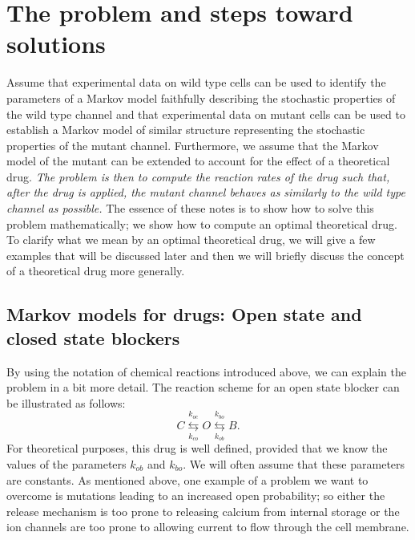 


\section{The problem and steps toward solutions}

Assume that experimental data on wild type cells can be used to identify the parameters of a Markov model faithfully describing the stochastic properties of the wild type channel and that experimental data on mutant cells can be used to establish a Markov model of similar structure representing the stochastic properties of the mutant channel. Furthermore, we assume that the Markov model of the mutant can be extended to account for the effect of a theoretical drug. {\it The problem is then to compute the reaction rates of the drug such that, after the drug is applied, the mutant channel behaves as similarly to the wild type channel as possible. } The essence of these notes is to show how to solve this problem mathematically; we show how to compute an optimal theoretical drug. To clarify what we mean by an optimal theoretical drug, we will give a few examples that will be discussed later and then we will briefly discuss the concept of a theoretical drug  more generally.

 \subsection{Markov models for drugs: Open state and closed state blockers}
 By using the notation of chemical reactions introduced above, we can explain the problem in a bit more detail. The reaction scheme for an open state blocker can be illustrated as follows:
\begin{equation}
C\underset{ k_{co}}{\overset{k_{oc}}{\leftrightarrows}}O\underset{k_{ob}%
}{\overset{k_{bo}}{\leftrightarrows}}B. \label{open_block}
\end{equation}
For theoretical purposes, this drug is well defined, provided that we know the values of the parameters $k_{ob}$ and $k_{bo}$. We will often assume that these parameters are constants. As mentioned above, one example of a problem we want to overcome
is mutations leading to an increased open probability; so either the release mechanism is too prone to releasing calcium from internal storage or the ion channels are too prone to allowing  current to flow through the cell membrane. 


